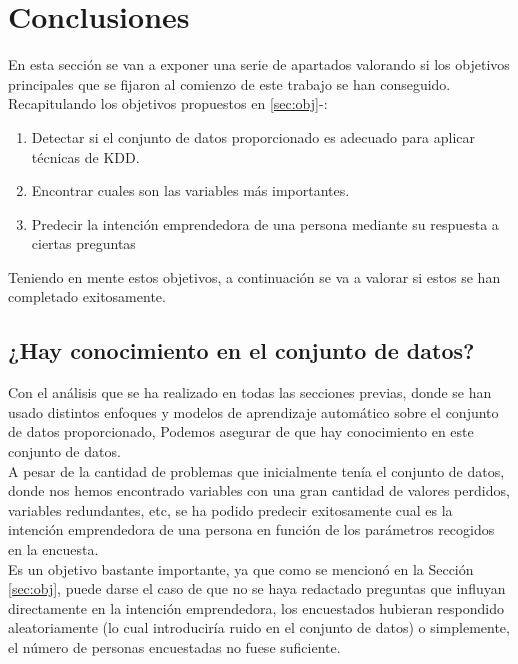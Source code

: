 \chapter{Conclusiones}
\label{sec:conclusiones}
En esta sección se van a exponer una serie de apartados valorando si los objetivos principales que se fijaron al comienzo de este trabajo se han conseguido.\\
\linebreak
Recapitulando los objetivos propuestos en \ref{sec:obj}-:
\begin{enumerate}[1.]
	\item Detectar si el conjunto de datos proporcionado es adecuado para aplicar técnicas de KDD.
	\item Encontrar cuales son las variables más importantes.
	\item Predecir la intención emprendedora de una persona mediante su respuesta a ciertas preguntas
\end{enumerate}
Teniendo en mente estos objetivos, a continuación se va a valorar si estos se han completado exitosamente.
\section{¿Hay conocimiento en el conjunto de datos?}
\label{sec:con}
Con el análisis que se ha realizado en todas las secciones previas, donde se han usado distintos enfoques y modelos de aprendizaje automático sobre el conjunto de datos proporcionado, Podemos asegurar de que hay conocimiento en este conjunto de datos.\\
\linebreak
A pesar de la cantidad de problemas que inicialmente tenía el conjunto de datos, donde nos hemos encontrado variables con una gran cantidad de valores perdidos, variables redundantes, etc, se ha podido predecir exitosamente cual es la intención emprendedora de una persona en función de los parámetros recogidos en la encuesta.\\
Es un objetivo bastante importante, ya que como se mencionó en la Sección \ref{sec:obj}, puede darse el caso de que no se haya redactado preguntas que influyan directamente en la intención emprendedora, los encuestados hubieran respondido aleatoriamente (lo cual introduciría ruido en el conjunto de datos) o simplemente, el número de personas encuestadas no fuese suficiente.\\
